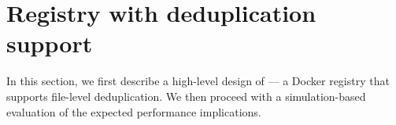 \section{Registry with deduplication support}
\label{sec:file_adressable}

%
In this section, we first describe a high-level design of \emph{\sysname}---
a Docker registry that supports file-level deduplication.
We then proceed with a simulation-based evaluation of the expected performance
implications.






